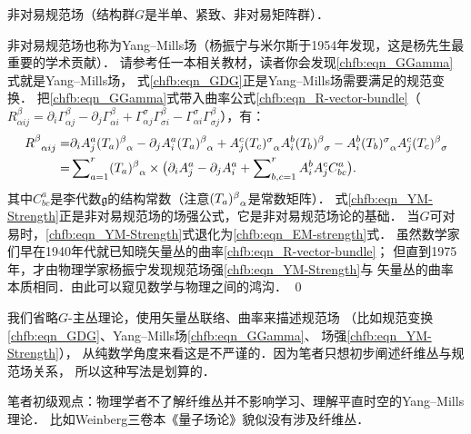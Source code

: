 \begin{example}
	非对易规范场（结构群$G$是半单、紧致、非对易矩阵群）．
\end{example}
非对易规范场也称为Yang--Mills场（杨振宁与米尔斯于1954年发现，这是杨先生最重要的学术贡献）．
请参考任一本相关教材，读者你会发现\eqref{chfb:eqn_GGamma}式就是Yang--Mills场，
式\eqref{chfb:eqn_GDG}正是Yang--Mills场需要满足的规范变换．
把\eqref{chfb:eqn_GGamma}式带入曲率公式\eqref{chfb:eqn_R-vector-bundle}（$R_{\alpha i j}^\beta 
= {\partial_i} \Gamma_{\alpha j}^{\beta} -\partial_j \Gamma_{\alpha i}^{\beta}
+\Gamma_{\alpha j}^{\sigma} \Gamma_{\sigma i}^{\beta} 
-  \Gamma_{\alpha i}^{\sigma}\Gamma_{\sigma j}^{\beta}$），有：
\begin{align}
	R_{\hphantom{\alpha}\alpha i j}^\beta 
	=&{\partial_i} A^a_j (T_a)_{\hphantom{\alpha}\alpha}^\beta 
	-\partial_j A^a_i (T_a)_{\hphantom{\alpha}\alpha}^\beta 
	+A^c_j (T_c)_{\hphantom{\alpha}\alpha}^\sigma  A^b_i (T_b)_{\hphantom{\alpha}\sigma}^\beta
	-A^b_i (T_b)_{\hphantom{\alpha}\alpha}^\sigma  A^c_j (T_c)_{\hphantom{\alpha}\sigma}^\beta \notag\\
	=& \sum\nolimits_{a=1}^{r}(T_a)_{\hphantom{\alpha}\alpha}^\beta  \times \bigl(
	{\partial_i} A^a_j  -\partial_j A^a_i  + \sum\nolimits_{b,c=1}^{r} A^b_i A^c_j C_{bc}^a    \bigr) .
	\label{chfb:eqn_YM-Strength}
\end{align}
其中$C_{bc}^a$是李代数$\mathfrak{g}$的结构常数（注意$(T_a)_{\hphantom{\alpha}\alpha}^\beta $是常数矩阵）．
式\eqref{chfb:eqn_YM-Strength}正是非对易规范场的场强公式，它是非对易规范场论的基础．
当$G$可对易时，\eqref{chfb:eqn_YM-Strength}式退化为\eqref{chfb:eqn_EM-strength}式．
虽然数学家们早在1940年代就已知晓矢量丛的曲率\eqref{chfb:eqn_R-vector-bundle}；
但直到1975年，才由物理学家杨振宁发现规范场强\eqref{chfb:eqn_YM-Strength}与
矢量丛的曲率本质相同．由此可以窥见数学与物理之间的鸿沟．
\qed


\begin{remark}
	我们{\kaishu 省略$G$-主丛理论}，使用矢量丛联络、曲率来描述规范场
	（比如规范变换\eqref{chfb:eqn_GDG}、Yang--Mills场\eqref{chfb:eqn_GGamma}、
	场强\eqref{chfb:eqn_YM-Strength}），
	从纯数学角度来看这是不严谨的．因为笔者只想初步阐述纤维丛与规范场关系，
	所以这种写法是划算的．
\end{remark}

\begin{remark}\label{chfb:rem_qft}
	笔者初级观点：物理学者不了解纤维丛并不影响学习、理解平直时空的Yang--Mills理论．
	比如Weinberg三卷本《量子场论》貌似没有涉及纤维丛．
\end{remark}









